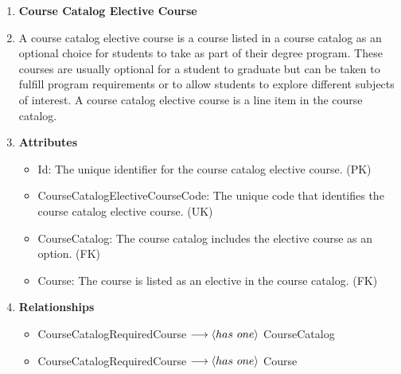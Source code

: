 \documentclass[12pt]{article}
\begin{document}
\begin{appendices}
\begin{enumerate}[label=(\roman*)]
    \item \textbf{Course Catalog Elective Course}
    \item[] A course catalog elective course is a course listed in a course catalog as an optional choice for students to take as part of their degree program. These courses are usually optional for a student to graduate but can be taken to fulfill program requirements or to allow students to explore different subjects of interest. A course catalog elective course is a line item in the course catalog.
    \item[] \textbf{Attributes}
    \begin{itemize}
        \item Id: The unique identifier for the course catalog elective course. (PK)
        \item CourseCatalogElectiveCourseCode: The unique code that identifies the course catalog elective course. (UK)
        \item CourseCatalog: The course catalog includes the elective course as an option. (FK)
        \item Course: The course is listed as an elective in the course catalog. (FK)
    \end{itemize}
    \item[] \textbf{Relationships}
    \begin{itemize}
        \item CourseCatalogRequiredCourse $ \longrightarrow \langle has \hspace{0.125cm} one \rangle $ CourseCatalog
        \item CourseCatalogRequiredCourse $ \longrightarrow \langle has \hspace{0.125cm} one \rangle $ Course
    \end{itemize}


\end{enumerate}
\end{appendices}
\end{document}
